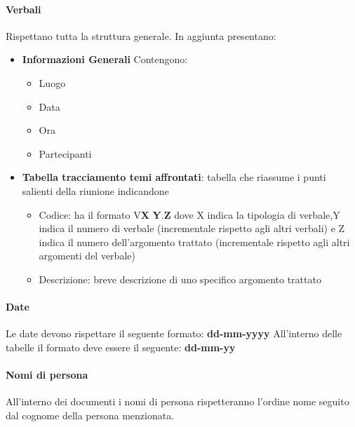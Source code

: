 \paragraph{Verbali}
Rispettano tutta la struttura generale.
In aggiunta presentano:
\begin{itemize} 
    \item \textbf{Informazioni Generali}
    Contengono:
    \begin{itemize} 
        \item Luogo
        \item Data
        \item Ora
        \item Partecipanti
    \end{itemize}
\item \textbf{Tabella tracciamento temi affrontati}:
tabella che riassume i punti salienti della riunione indicandone
    \begin{itemize} 
        \item Codice: ha il formato V\textbf{X} \textbf{Y}.\textbf{Z} dove X indica la tipologia di verbale,Y indica il numero di verbale (incrementale rispetto agli altri verbali) 
        e Z indica il numero dell'argomento trattato (incrementale rispetto agli altri argomenti del verbale) 
        \item Descrizione: breve descrizione di uno specifico argomento trattato
    \end{itemize}

\end{itemize}

\paragraph{Date}
Le date devono rispettare il seguente formato: \textbf{dd-mm-yyyy}
All'interno delle tabelle il formato deve essere il seguente: \textbf{dd-mm-yy}
\paragraph{Nomi di persona}
All'interno dei documenti i nomi di persona rispetteranno l'ordine nome seguito dal cognome della persona menzionata.